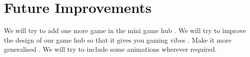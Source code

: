 \documentclass{article}
\begin{document}
\section{Future Improvements}
We will try to add one more game in the mini game hub . We will try to improve the design of our game hub so that it gives you gaming vibes . Make it more generalised . We will try to include some animations wherever required.


\end{document}
